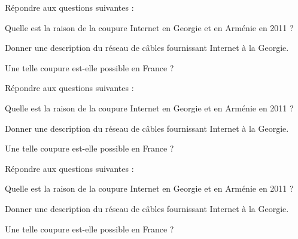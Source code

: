 \documentclass{exos}
\begin{document}
\begin{exercize*}
Répondre aux questions suivantes :
\begin{alphaquestions}
\item Quelle est la raison de la coupure Internet en Georgie et en Arménie en 2011 ?
\item Donner une description du réseau de câbles fournissant Internet à la Georgie.
\item Une telle coupure est-elle possible en France ?
\end{alphaquestions}
\end{exercize*}
\vspace*{4cm}
\begin{exercize*}
Répondre aux questions suivantes :
\begin{alphaquestions}
\item Quelle est la raison de la coupure Internet en Georgie et en Arménie en 2011 ?
\item Donner une description du réseau de câbles fournissant Internet à la Georgie.
\item Une telle coupure est-elle possible en France ?
\end{alphaquestions}
\end{exercize*}
\vspace*{4cm}
\begin{exercize*}
Répondre aux questions suivantes :
\begin{alphaquestions}
\item Quelle est la raison de la coupure Internet en Georgie et en Arménie en 2011 ?
\item Donner une description du réseau de câbles fournissant Internet à la Georgie.
\item Une telle coupure est-elle possible en France ?
\end{alphaquestions}
\end{exercize*}
\end{document}
